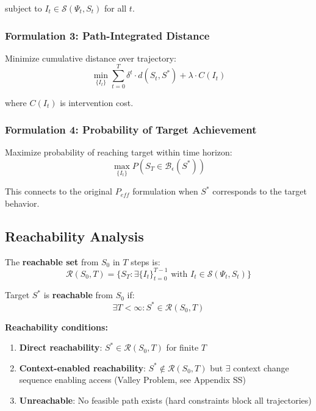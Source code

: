 subject to $I_t \in \mathcal{S}(\Psi_t, S_t)$ for all $t$.

\subsubsection{Formulation 3: Path-Integrated Distance}

Minimize cumulative distance over trajectory:
\begin{equation}
\boxed{
\min_{\{I_t\}} \sum_{t=0}^{T} \delta^t \cdot d(S_t, S^*) + \lambda \cdot C(I_t)
}
\label{eq:mp-path-integrated}
\end{equation}

where $C(I_t)$ is intervention cost.

\subsubsection{Formulation 4: Probability of Target Achievement}

Maximize probability of reaching target within time horizon:
\begin{equation}
\boxed{
\max_{\{I_t\}} P\left(S_T \in \mathcal{B}_\epsilon(S^*)\right)
}
\label{eq:mp-prob-target}
\end{equation}

This connects to the original $P_{eff}$ formulation when $S^*$ corresponds to the target behavior.

\subsection{Reachability Analysis}

\begin{definition}
The \textbf{reachable set} from $S_0$ in $T$ steps is:
\begin{equation}
\mathcal{R}(S_0, T) = \{S_T : \exists \{I_t\}_{t=0}^{T-1} \text{ with } I_t \in \mathcal{S}(\Psi_t, S_t)\}
\end{equation}
\end{definition}

\begin{definition}
Target $S^*$ is \textbf{reachable} from $S_0$ if:
\begin{equation}
\exists T < \infty : S^* \in \mathcal{R}(S_0, T)
\end{equation}
\end{definition}

\textbf{Reachability conditions:}
\begin{enumerate}
\item \textbf{Direct reachability}: $S^* \in \mathcal{R}(S_0, T)$ for finite $T$
\item \textbf{Context-enabled reachability}: $S^* \notin \mathcal{R}(S_0, T)$ but $\exists$ context change sequence enabling access (Valley Problem, see Appendix SS)
\item \textbf{Unreachable}: No feasible path exists (hard constraints block all trajectories)
\end{enumerate}

